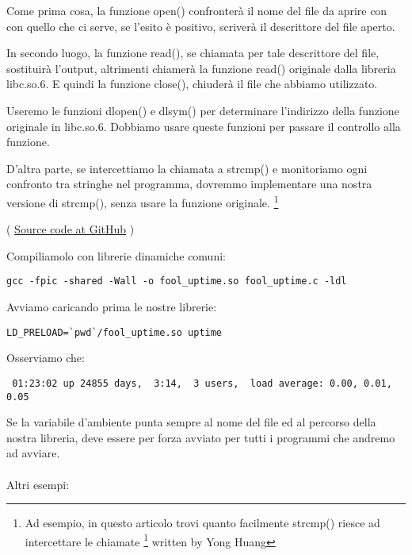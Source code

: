 Come prima cosa, la funzione open() confronterà il nome del file da aprire con con quello che ci serve,
se l'esito è positivo, scriverà il descrittore del file aperto.

In secondo luogo, la funzione read(), se chiamata per tale descrittore del file, sostituirà l'output, altrimenti chiamerà 
la funzione read() originale dalla libreria libc.so.6.
E quindi la funzione close(), chiuderà il file che abbiamo utilizzato.


Useremo le funzioni dlopen() e dlsym() per determinare l'indirizzo della funzione originale in libc.so.6.
Dobbiamo usare queste funzioni per passare il controllo alla  funzione.


D'altra parte, se intercettiamo la chiamata a strcmp() e monitoriamo ogni confronto tra stringhe
nel programma, dovremmo implementare una nostra versione di strcmp(), senza usare la funzione originale.
\footnote{Ad esempio, in questo articolo trovi quanto facilmente strcmp() riesce ad intercettare le chiamate
\footnote{\href{http://go.yurichev.com/17143}{yurichev.com}}
written by Yong Huang}


( \href{https://github.com/DennisYurichev/RE-for-beginners/blob/master/OS/LD_PRELOAD/fool_uptime.c}{Source code at GitHub} )

Compiliamolo con librerie dinamiche comuni:

\begin{lstlisting}
gcc -fpic -shared -Wall -o fool_uptime.so fool_uptime.c -ldl
\end{lstlisting}

Avviamo  caricando prima le nostre librerie:

\begin{lstlisting}
LD_PRELOAD=`pwd`/fool_uptime.so uptime
\end{lstlisting}

Osserviamo che:

\begin{lstlisting}
 01:23:02 up 24855 days,  3:14,  3 users,  load average: 0.00, 0.01, 0.05
\end{lstlisting}

Se la variabile d'ambiente  punta sempre al nome del file ed al percorso della nostra libreria, 
deve essere per forza avviato per tutti i programmi che andremo ad avviare. \\
\\
Altri esempi:

